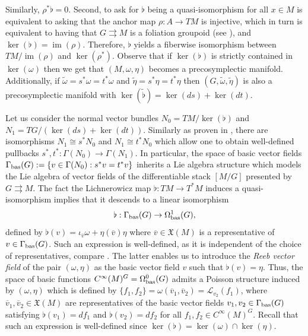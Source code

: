\documentclass[
  a4paper, 
  reqno, 
  oneside, 
  12pt
]{amsart}
\theoremstyle{definition}
\theoremstyle{remark}
\DeclareMathOperator{\im}{im}
\newcommand{\rr}{\rightrightarrows}
\begin{document}
Similarly, $\rho^*\flat=0$. Second, to ask for $\flat$ being a quasi-isomorphism for all $x\in M$ is equivalent to asking that the anchor map $\rho:A\to TM$ is injective, which in turn is equivalent to having that $G\rr M$ is a foliation groupoid (see \cite{CrainicMoerdijk}), and $\ker(\flat)=\im(\rho)$. Therefore, $\flat$ yields a fiberwise isomorphism between $TM/\im(\rho)$ and $\ker(\rho^\ast)$. Observe that if $\ker(\flat)$ is strictly contained in $\ker(\omega)$ then we get that $(M,\omega,\eta)$ becomes a precosymplectic manifold. Additionally, if $\tilde{\omega}=s^\ast \omega=t^\ast \omega$ and $\tilde{\eta}=s^\ast \eta=t^\ast \eta$ then $(G,\tilde{\omega},\tilde{\eta})$ is also a precosymplectic manifold with $\ker(\tilde{\flat})=\ker(ds)+\ker(dt)$. 

Let us consider the normal vector bundles $N_0=TM/\ker(\flat)$ and $N_1=TG/(\ker(ds)+\ker(dt))$. Similarly as proven in \cite{HoffmanSjamaar}, there are isomorphisms $N_1\cong s^\ast N_0$ and $N_1\cong t^\ast N_0$ which allow one to obtain well-defined pullbacks $s^\ast, t^\ast:\Gamma(N_0)\to \Gamma(N_1)$. In particular, the space of basic vector fields $\Gamma_{\textnormal{bas}}(G):=\lbrace v\in \Gamma(N_0): s^\ast v= t^\ast v\rbrace$ inherits a Lie algebra structure which models the Lie algebra of vector fields of the differentiable stack $[M/G]$ presented by $G\rr M$. The fact the Lichnerowicz map $\flat:TM\to T^\ast M$ induces a quasi-isomorphism implies that it descends to a linear isomorphism 
$$\flat:\Gamma_{\textnormal{bas}}(G)\to \Omega_{\textnormal{bas}}^1(G),$$
defined by $\flat(v)=\iota_{\overline{v}}\omega+\eta(\overline{v})\eta$ where $\overline{v}\in \mathfrak{X}(M)$ is a representative of $v\in \Gamma_{\textnormal{bas}}(G)$. Such an expression is well-defined, as it is independent of the choice of representatives, compare \cite[p. 15]{HoffmanSjamaar}. The latter enables us to introduce the \emph{Reeb vector field} of the pair $(\omega,\eta)$ as the basic vector field $v$ such that $\flat(v)=\eta$. Thus, the space of basic functions $C^\infty(M)^G=\Omega_{\textnormal{bas}}^0(G)$ admits a Poisson structure induced by $(\omega,\eta)$ which is defined by  $\lbrace f_1,f_2\rbrace=\omega(\overline{v}_1,\overline{v}_2)=\mathcal{L}_{v_2}(f_1)$, where $\overline{v}_1,\overline{v}_2\in \mathfrak{X}(M)$ are representatives of the basic vector fields $v_1,v_2\in \Gamma_{\textnormal{bas}}(G)$ satisfying $\flat(v_1)=df_1$ and $\flat(v_2)=df_2$ for all $f_1,f_2\in C^\infty(M)^G$. Recall that such an expression is well-defined since $\ker(\flat)=\ker(\omega)\cap \ker(\eta)$. 
\end{document}
